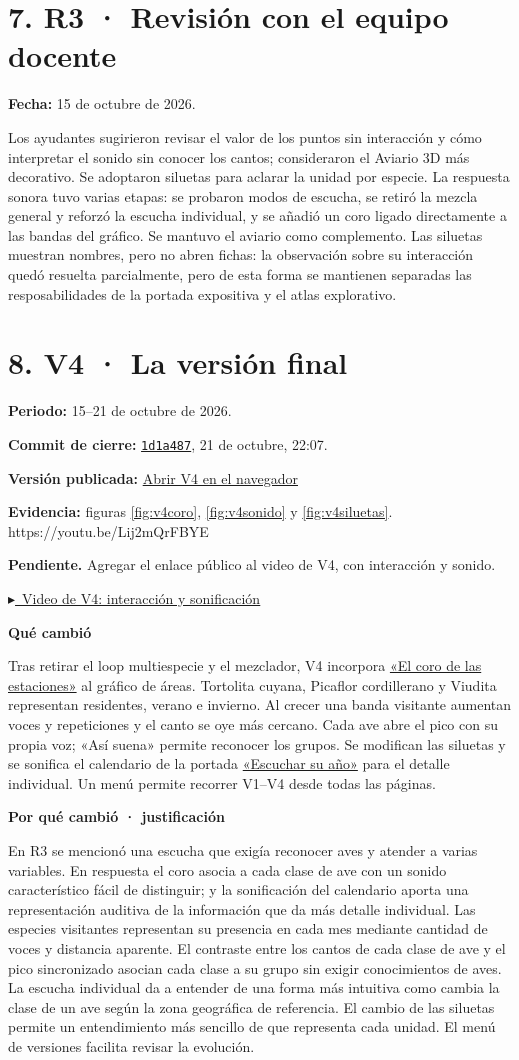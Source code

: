 \documentclass[11pt,a4paper]{article}
\newcommand{\VideoVCuatro}{https://youtu.be/Lij2mQrFBYE}
\newcommand{\Repo}{https://github.com/canija2000/infovis_2026-2}
\newcommand{\Sitio}{https://canija2000.github.io/infovis_2026-2/}
\newcommand{\falta}[1]{\par{\small\color{pendiente}\textbf{Pendiente.} #1}\par}
\newcommand{\campo}[1]{\par\needspace{3\baselineskip}\textbf{#1}\par\nopagebreak}
\newcommand{\commit}[2]{\href{\Repo/commit/#1}{\texttt{#2}}}
\newcommand{\versionweb}[1]{\par\textbf{Versión publicada:} \href{\Sitio v#1/}{\textcolor{acento}{Abrir V#1 en el navegador}}\quad{\small\texttt{/v#1/}}\par}
\newcommand{\video}[2]{\begingroup\edef\videourl{#1}\ifx\videourl\empty
  \falta{Agregar el enlace público al video #2, con interacción y sonido.}
  \else\par\href{#1}{\textcolor{acento}{$\blacktriangleright$\ \underline{Video #2: interacción y sonificación}}}\quad{\small\url{#1}}\par\fi\endgroup}
\newcommand{\seccion}[1]{\clearpage\section*{#1}}
\DeclareRobustCommand{\concepto}[2]{\hyperlink{concepto:#1}{\textcolor{acento}{#2}}}
\begin{document}
\section*{7. R3 · Revisión con el equipo docente}
\textbf{Fecha:} 15 de octubre de 2026.\par
Los ayudantes sugirieron revisar el valor de los puntos sin interacción y cómo interpretar el sonido sin conocer los cantos; consideraron el Aviario 3D más decorativo. Se adoptaron siluetas para aclarar la unidad por especie. La respuesta sonora tuvo varias etapas: se probaron modos de escucha, se retiró la mezcla general y reforzó la escucha individual, y se añadió un coro ligado directamente a las bandas del gráfico. Se mantuvo el aviario como complemento. Las siluetas muestran nombres, pero no abren fichas: la observación sobre su interacción quedó resuelta parcialmente, pero de esta forma se mantienen separadas las resposabilidades de la portada expositiva y el atlas explorativo.

\seccion{8. V4 · La versión final}
\textbf{Periodo:} 15--21 de octubre de 2026.\par
\textbf{Commit de cierre:} \commit{1d1a487fe85f888175b8eab92dab85885c407f73}{1d1a487}, 21 de octubre, 22:07.\par
\versionweb{4}
\textbf{Evidencia:} figuras \ref{fig:v4coro}, \ref{fig:v4sonido} y \ref{fig:v4siluetas}.
\video{\VideoVCuatro}{de V4}

\campo{Qué cambió}
Tras retirar el loop multiespecie y el mezclador, V4 incorpora \concepto{coro-estaciones}{«El coro de las estaciones»} al gráfico de áreas. Tortolita cuyana, Picaflor cordillerano y Viudita representan residentes, verano e invierno. Al crecer una banda visitante aumentan voces y repeticiones y el canto se oye más cercano. Cada ave abre el pico con su propia voz; «Así suena» permite reconocer los grupos. Se modifican las siluetas y se sonifica el calendario de la portada \concepto{ano-especie}{«Escuchar su año»} para el detalle individual. Un menú permite recorrer V1--V4 desde todas las páginas.

\campo{Por qué cambió · justificación}
En R3 se mencionó una escucha que exigía reconocer aves y atender a varias variables. En respuesta el coro asocia a cada clase de ave con un sonido característico fácil de distinguir; y la sonificación del calendario aporta una representación auditiva de la información que da más detalle individual. Las especies visitantes representan su presencia en cada mes mediante cantidad de voces y distancia aparente. El contraste entre los cantos de cada clase de ave y el pico sincronizado asocian cada clase a su grupo sin exigir conocimientos de aves. La escucha individual da a entender de una forma más intuitiva como cambia la clase de un ave según la zona geográfica de referencia. El cambio de las siluetas permite un entendimiento más sencillo de que representa cada unidad. El menú de versiones facilita revisar la evolución.
\end{document}
